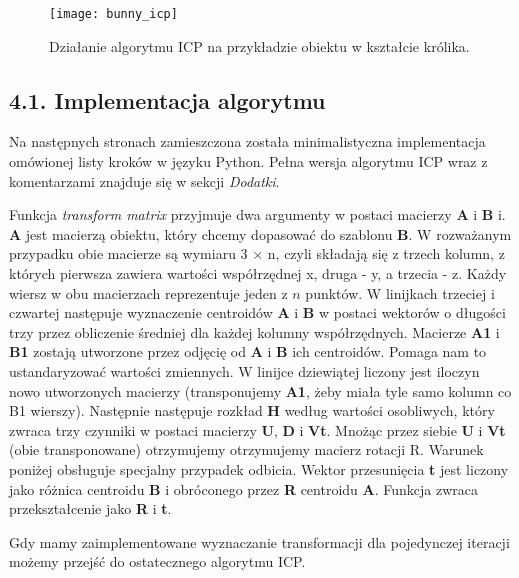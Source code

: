 \documentclass{article}
\begin{document}
\begin{figure}[h!]
\centering
\texttt{[image: bunny\_icp]}
\caption{Działanie algorytmu ICP na przykładzie obiektu w kształcie królika.}
\end{figure}

\newpage
\subsection*{\LARGE{4.1. Implementacja algorytmu}} 
Na następnych stronach zamieszczona została minimalistyczna implementacja omówionej listy kroków w języku Python. Pełna wersja algorytmu ICP wraz z komentarzami znajduje się w sekcji \emph{Dodatki}.

\newpage

\vspace{5mm}

Funkcja \emph{transform matrix} przyjmuje dwa argumenty w postaci macierzy \textbf{A} i \textbf{B} i. \textbf{A} jest macierzą obiektu, który chcemy dopasować do szablonu \textbf{B}. W rozważanym przypadku obie macierze są wymiaru 3 $\times$ n, czyli składają się z trzech kolumn, z których pierwsza zawiera wartości współrzędnej x, druga - y, a trzecia - z. Każdy wiersz w obu macierzach reprezentuje jeden z $n$ punktów. W linijkach trzeciej i czwartej następuje wyznaczenie centroidów \textbf{A} i \textbf{B} w postaci wektorów o długości trzy przez obliczenie średniej dla każdej kolumny współrzędnych. Macierze \textbf{A1} i \textbf{B1} zostają utworzone przez odjęcię od \textbf{A} i \textbf{B} ich centroidów. Pomaga nam to ustandaryzować wartości zmiennych. W linijce dziewiątej liczony jest iloczyn nowo utworzonych macierzy (transponujemy \textbf{A1}, żeby miała tyle samo kolumn co B1 wierszy). Następnie następuje rozkład \textbf{H} według wartości osobliwych, który zwraca trzy czynniki w postaci macierzy \textbf{U}, \textbf{D} i \textbf{Vt}. Mnożąc przez siebie \textbf{U} i \textbf{Vt} (obie transponowane) otrzymujemy otrzymujemy macierz rotacji R. Warunek poniżej obsługuje specjalny przypadek odbicia. Wektor przesunięcia \textbf{t} jest liczony jako różnica centroidu \textbf{B} i obróconego przez \textbf{R} centroidu \textbf{A}. Funkcja zwraca przekształcenie jako \textbf{R} i \textbf{t}.

Gdy mamy zaimplementowane wyznaczanie transformacji dla pojedynczej iteracji możemy przejść do ostatecznego algorytmu ICP.

\vspace{5mm}

\vspace{5mm}
\end{document}
